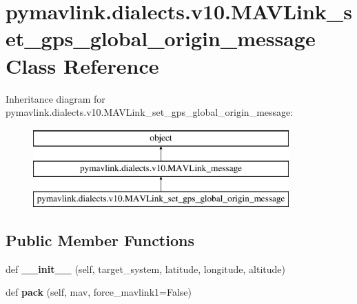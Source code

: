 \hypertarget{classpymavlink_1_1dialects_1_1v10_1_1MAVLink__set__gps__global__origin__message}{}\section{pymavlink.\+dialects.\+v10.\+M\+A\+V\+Link\+\_\+set\+\_\+gps\+\_\+global\+\_\+origin\+\_\+message Class Reference}
\label{classpymavlink_1_1dialects_1_1v10_1_1MAVLink__set__gps__global__origin__message}
Inheritance diagram for pymavlink.\+dialects.\+v10.\+M\+A\+V\+Link\+\_\+set\+\_\+gps\+\_\+global\+\_\+origin\+\_\+message\+:\begin{figure}[H]
\begin{center}
\leavevmode
\includegraphics[height=3.000000cm]{classpymavlink_1_1dialects_1_1v10_1_1MAVLink__set__gps__global__origin__message}
\end{center}
\end{figure}
\subsection*{Public Member Functions}
\begin{DoxyCompactItemize}
\item 
\mbox{\label{classpymavlink_1_1dialects_1_1v10_1_1MAVLink__set__gps__global__origin__message_a4096e03f53a69ebce9356ce02e3c9e1d}} 
def {\bfseries \+\_\+\+\_\+init\+\_\+\+\_\+} (self, target\+\_\+system, latitude, longitude, altitude)
\item 
\mbox{\label{classpymavlink_1_1dialects_1_1v10_1_1MAVLink__set__gps__global__origin__message_a6f4972997db7e2909168d8069e06ba31}} 
def {\bfseries pack} (self, mav, force\+\_\+mavlink1=False)
\end{DoxyCompactItemize}
